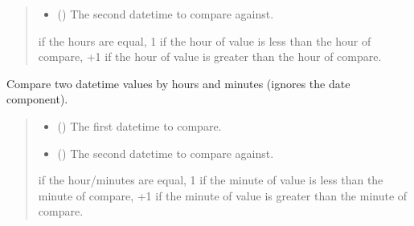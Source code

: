 \documentclass[letterpaper,10pt,english]{sphinxmanual}
\begin{document}
\begin{fulllineitems}
\begin{fulllineitems}
\begin{quote}
\begin{description}
\begin{itemize}
\item {} 
\sphinxAtStartPar
{} () \textendash{} The second datetime to compare against.

\end{itemize}

 if the hours are equal,
\sphinxhyphen{}1 if the hour of value is less than the hour of compare,
+1 if the hour of value is greater than the hour of compare.

\end{description}\end{quote}

\end{fulllineitems}


\begin{fulllineitems}
\label{\detokenize{apache_commons_validator_python.routines:apache_commons_validator_python.routines.time_validator.TimeValidator.compare_minutes}}
\pysigstartsignatures
{}
\pysigstopsignatures
\sphinxAtStartPar
Compare two datetime values by hours and minutes (ignores the date
component).
\begin{quote}\begin{description}
\begin{itemize}
\item {} 
\sphinxAtStartPar
{} () \textendash{} The first datetime to compare.

\item {} 
\sphinxAtStartPar
{} () \textendash{} The second datetime to compare against.

\end{itemize}

 if the hour/minutes are equal,
\sphinxhyphen{}1 if the minute of value is less than the minute of compare,
+1 if the minute of value is greater than the minute of compare.


\end{description}
\end{quote}
\end{fulllineitems}
\end{fulllineitems}
\end{document}
